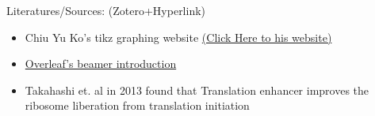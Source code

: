 
\begin{frame}[fragile]{Literatures/Sources: (Zotero+Hyperlink)}
\begin{itemize}
    \item Chiu Yu Ko's tikz graphing website \href{https://sites.google.com/site/kochiuyu/Tikz#TOC-Network-Effect}{(Click Here to his website)} 

    
    \item  \href{https://www.overleaf.com/learn/latex/Beamer} {Overleaf's beamer introduction}
    \item Takahashi et. al in 2013 \cite{takahashi_translation_2013} found that  Translation enhancer improves the ribosome liberation from translation initiation
     
\end{itemize}
    
\end{frame}
